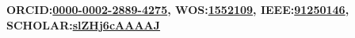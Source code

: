 \documentclass[mm,10pt,a4paper]{simple_style}
\newcommand{\MyLinks}{\noindent
\textbf{ORCID:\href{http://orcid.org/0000-0002-2889-4275}{0000-0002-2889-4275}, \hfill
WOS:\href{https://www.webofscience.com/wos/author/record/1552109}{1552109}, \hfill
IEEE:\href{https://ieeexplore.ieee.org/author/37086581106}{91250146}, \hfill
SCHOLAR:\href{https://scholar.google.co.in/citations?user=slZHj6cAAAAJ}{slZHj6cAAAAJ}\ }}
\begin{document}
\begin{resume}
\fullline
\small{\hspace*{-10.2em}\MyLinks} \\
\vspace{-1em}
\sectionline
%
%
%
%



%
%
%
%
%
\end{resume}
\nocite{*}
\end{document}
